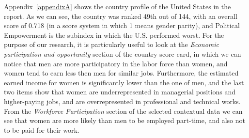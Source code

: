 Appendix~\ref{appendixA} shows the country profile of the United States in the report. As we can see, the country was ranked 49th out of 144, with an overall score of 0.718 (in a score system in which 1 means gender parity), and Political Empowerment is the subindex in which the U.S. performed worst. For the purpose of our research, it is particularly useful to look at the \textit{Economic participation and opportunity} section of the country score card, in which we can notice that men are more participatory in the labor force than women, and women tend to earn less then men for similar jobs. Furthermore, the estimated earned income for women is significantly lower than the one of men, and the last two items show that women are underrepresented in managerial positions and higher-paying jobs, and are overrepresented in professional and technical works. From the \textit{Workforce Participation} section of the selected contextual data we can see that women are more likely than men to be employed part-time, and also not to be paid for their work.

